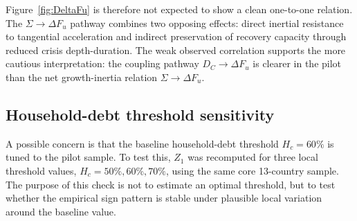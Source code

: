 \documentclass[11pt]{article}
\begin{document}
Figure~\ref{fig:DeltaFu} is therefore not expected to show a clean one-to-one relation. The $\Sigma\rightarrow\Delta F_u$ pathway combines two opposing effects: direct inertial resistance to tangential acceleration and indirect preservation of recovery capacity through reduced crisis depth-duration. The weak observed correlation supports the more cautious interpretation: the coupling pathway $D_C\rightarrow\Delta F_u$ is clearer in the pilot than the net growth-inertia relation $\Sigma\rightarrow\Delta F_u$.


\subsection{Household-debt threshold sensitivity}
\label{sec:HcSensitivity}
A possible concern is that the baseline household-debt threshold $H_c=60\%$ is tuned to the pilot sample. To test this, $Z_1$ was recomputed for three local threshold values, $H_c=50\%,60\%,70\%$, using the same core 13-country sample. The purpose of this check is not to estimate an optimal threshold, but to test whether the empirical sign pattern is stable under plausible local variation around the baseline value.

\begin{table}[H]
\centering
\caption{Sensitivity of the stabilizer-to-exposure coordinate to the household-debt threshold $H_c$. Pearson correlations, two-sided Pearson $p$-values, and Spearman correlations are reported for the core $Z_1$ scaling sample. The sign pattern is preserved across the tested thresholds: $Z_1$ remains positively associated with the shock-year relative-insulation coordinate $R_{2009}$ and negatively associated with the consumption depth-duration coordinate $D_C$. The $Z_1\to R_{2009}$ association is significant at conventional levels for the tested thresholds, whereas the upstream $Z_1\to D_C$ association is not.}
\label{tab:HcSensitivity}
\end{table}
\end{document}
